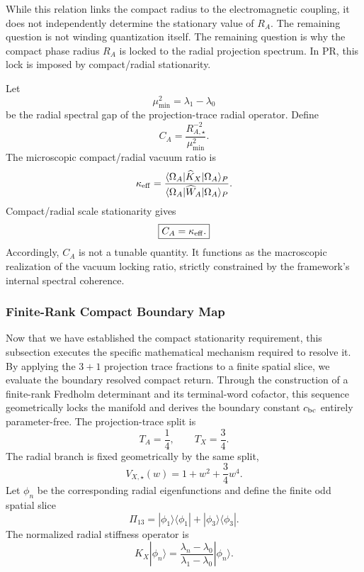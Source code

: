 \documentclass[11pt]{article}
\begin{document}
While this relation links the compact radius to the electromagnetic coupling, it
does not independently determine the stationary value of \(R_A\). The remaining
question is not winding quantization itself. The remaining question is why the
compact phase radius \(R_A\) is locked to the radial projection spectrum. In PR,
this lock is imposed by compact/radial stationarity.

Let
\begin{equation}
\mu_{\min}^2
=
\lambda_1-\lambda_0
\end{equation}
be the radial spectral gap of the projection-trace radial operator. Define
\begin{equation}
C_A
=
\frac{R_{A,\star}^{-2}}{\mu_{\min}^2}.
\end{equation}
The microscopic compact/radial vacuum ratio is
\begin{equation}
\kappa_{\rm eff}
=
\frac{
\langle\Omega_A|\widehat K_X|\Omega_A\rangle_P
}{
\langle\Omega_A|\widehat W_A|\Omega_A\rangle_P
}.
\end{equation}
Compact/radial scale stationarity gives
\begin{equation}
\boxed{
C_A=\kappa_{\rm eff}.
}
\end{equation}
Accordingly, \(C_A\) is not a tunable quantity. It functions as the macroscopic
realization of the vacuum locking ratio, strictly constrained by the framework's
internal spectral coherence.

\subsubsection{Finite-Rank Compact Boundary Map}
\label{sec:finite_rank_compact_boundary_map}
Now that we have established the compact stationarity requirement, this subsection executes the specific mathematical mechanism required to resolve it. By applying the \(3+1\) projection trace fractions to a finite spatial slice, we evaluate the boundary resolved compact return. Through the construction of a finite-rank Fredholm determinant and its terminal-word cofactor, this sequence geometrically locks the manifold and derives the boundary constant \(c_{\rm bc}\) entirely parameter-free. The projection-trace split is
\begin{equation}
T_A=\frac14,
\qquad
T_X=\frac34.
\end{equation}
The radial branch is fixed geometrically by the same split,
\begin{equation}
V_{X,\star}(w)
=
1+w^2+\frac34w^4.
\end{equation}
Let \(\phi_n\) be the corresponding radial eigenfunctions and define the finite
odd spatial slice
\begin{equation}
\Pi_{13}
=
|\phi_1\rangle\langle\phi_1|
+
|\phi_3\rangle\langle\phi_3|.
\end{equation}
The normalized radial stiffness operator is
\begin{equation}
K_X|\phi_n\rangle
=
\frac{\lambda_n-\lambda_0}{\lambda_1-\lambda_0}
|\phi_n\rangle.
\end{equation}
\end{document}
